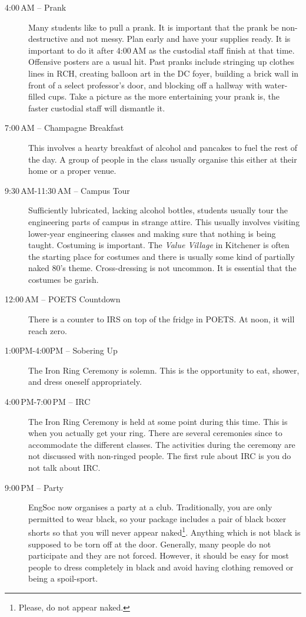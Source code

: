 \documentclass{book}
\begin{document}
\begin{description}
\item[4:00\,AM -- Prank] Many students like to pull a prank. It is important that the prank be non-destructive and not messy. Plan early and have your supplies ready. It is important to do it after 4:00\,AM as the custodial staff finish at that time. Offensive posters are a usual hit. Past pranks include stringing up clothes lines in RCH, creating balloon art in the DC foyer, building a brick wall in front of a select professor's door, and blocking off a hallway with water-filled cups. Take a picture as the more entertaining your prank is, the faster custodial staff will dismantle it.
\item[7:00\,AM -- Champagne Breakfast] This involves a hearty breakfast of alcohol and pancakes to fuel the rest of the day. A group of people in the class usually organise this either at their home or a proper venue.
\item[9:30\,AM-11:30\,AM -- Campus Tour] Sufficiently lubricated, lacking alcohol bottles, students usually tour the engineering parts of campus in strange attire. This usually involves visiting lower-year engineering classes and making sure that nothing is being taught. Costuming is important. The \textit{Value Village} in Kitchener is often the starting place for costumes and there is usually some kind of partially naked 80's theme. Cross-dressing is not uncommon. It is essential that the costumes be garish.
\item[12:00\,AM -- POETS Countdown] There is a counter to IRS on top of the fridge in POETS. At noon, it will reach zero.
\item[1:00PM-4:00PM -- Sobering Up] The Iron Ring Ceremony is solemn. This is the opportunity to eat, shower, and dress oneself appropriately.
\item[4:00\,PM-7:00\,PM -- IRC] The Iron Ring Ceremony is held at some point during this time. This is when you actually get your ring. There are several ceremonies since to accommodate the different classes. The activities during the ceremony are not discussed with non-ringed people. The first rule about IRC is you do not talk about IRC.
\item[9:00\,PM -- Party] EngSoc now organises a party at a club. Traditionally, you are only permitted to wear black, so your package includes a pair of black boxer shorts so that you will never appear naked\footnote{Please, do not appear naked.}. Anything which is not black is supposed to be torn off at the door. Generally, many people do not participate and they are not forced. However, it should be easy for most people to dress completely in black and avoid having clothing removed or being a spoil-sport.
\end{description}
\end{document}
